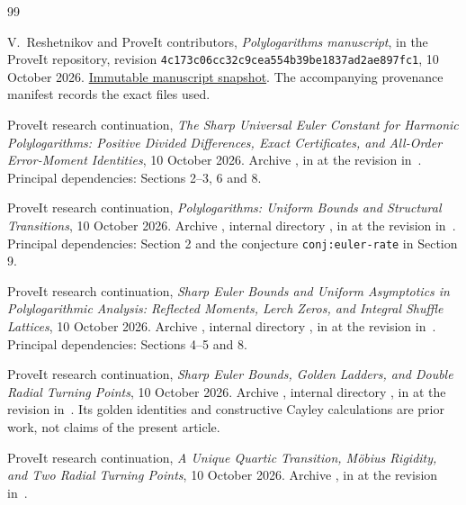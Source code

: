 \begin{thebibliography}{99}

V.~Reshetnikov and ProveIt contributors,
\emph{Polylogarithms manuscript}, in the ProveIt repository,
revision \texttt{4c173c06cc32c9cea554b39be1837ad2ae897fc1},
10 October 2026.
\href{https://github.com/VladimirReshetnikov/ProveIt/tree/4c173c06cc32c9cea554b39be1837ad2ae897fc1/Analysis/Polylogarithms/docs/manuscript}{Immutable manuscript snapshot}.
The accompanying provenance manifest records the exact files used.

ProveIt research continuation,
\emph{The Sharp Universal Euler Constant for Harmonic Polylogarithms:
Positive Divided Differences, Exact Certificates, and All-Order
Error-Moment Identities}, 10 October 2026.
Archive ,
in  at the revision in~\cite{ProveIt}.
Principal dependencies: Sections 2--3, 6 and 8.

ProveIt research continuation,
\emph{Polylogarithms: Uniform Bounds and Structural Transitions},
10 October 2026.
Archive ,
internal directory ,
in  at the revision in~\cite{ProveIt}.
Principal dependencies: Section 2 and the conjecture
\texttt{conj:euler-rate} in Section 9.

ProveIt research continuation,
\emph{Sharp Euler Bounds and Uniform Asymptotics in Polylogarithmic
Analysis: Reflected Moments, Lerch Zeros, and Integral Shuffle Lattices},
10 October 2026.
Archive ,
internal directory ,
in  at the revision in~\cite{ProveIt}.
Principal dependencies: Sections 4--5 and 8.

ProveIt research continuation,
\emph{Sharp Euler Bounds, Golden Ladders, and Double Radial Turning
Points}, 10 October 2026.
Archive ,
internal directory ,
in  at the revision in~\cite{ProveIt}.
Its golden identities and constructive Cayley calculations are prior
work, not claims of the present article.

ProveIt research continuation,
\emph{A Unique Quartic Transition, M\"obius Rigidity, and Two Radial
Turning Points}, 10 October 2026.
Archive ,
in  at the revision in~\cite{ProveIt}.


\end{thebibliography}
